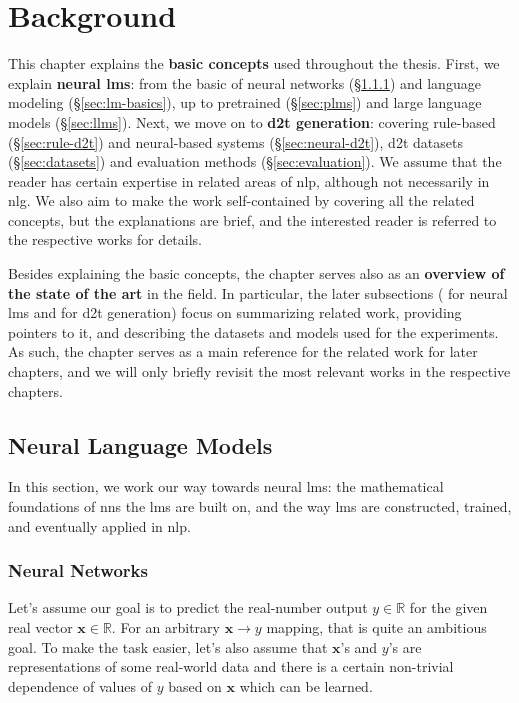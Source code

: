 
\chapter{Background}
\label{chap:background}

This chapter explains the \textbf{basic concepts} used throughout the thesis. First, we explain \textbf{neural \acp{lm}}: from the basic of neural networks (§\ref{sec:nns}) and language modeling (§\ref{sec:lm-basics}), up to pretrained (§\ref{sec:plms}) and large language models (§\ref{sec:llms}). Next, we move on to \textbf{\ac{d2t} generation}: covering rule-based (§\ref{sec:rule-d2t}) and neural-based systems (§\ref{sec:neural-d2t}), \ac{d2t} datasets (§\ref{sec:datasets}) and evaluation methods (§\ref{sec:evaluation}). We assume that the reader has certain expertise in related areas of \ac{nlp}, although not necessarily in \ac{nlg}. We also aim to make the work self-contained by covering all the related concepts, but the explanations are brief, and the interested reader is referred to the respective works for details.

Besides explaining the basic concepts, the chapter serves also as an \textbf{overview of the state of the art} in the field. In particular, the later subsections ( for neural \acp{lm} and  for \ac{d2t} generation) focus on summarizing related work, providing pointers to it, and describing the datasets and models used for the experiments. As such, the chapter serves as a main reference for the related work for later chapters, and we will only briefly revisit the most relevant works in the respective chapters.


\section{Neural Language Models}
\label{sec:lms}
In this section, we work our way towards neural \acp{lm}: the mathematical foundations of \acp{nn} the \acp{lm} are built on, and the way \acp{lm} are constructed, trained, and eventually applied in \ac{nlp}.

\subsection{Neural Networks}
\label{sec:nns}
Let's assume our goal is to predict the real-number output $y \in \mathbb{R}$ for the given real vector $\mathbf{x} \in \mathbb{R}$. For an arbitrary $\mathbf{x} \rightarrow y$ mapping, that is quite an ambitious goal. To make the task easier, let's also assume that $\mathbf{x}$'s and $y$'s are representations of some real-world data and there is a certain non-trivial dependence of values of $y$ based on $\mathbf{x}$ which can be learned.

